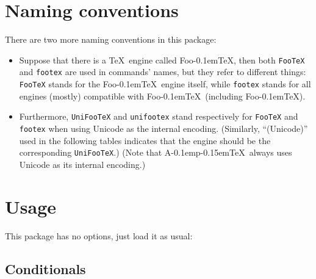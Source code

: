 \documentclass[a4paper]{article}
\newcommand\pTeX{p\kern-0.15em\TeX}
\newcommand\ApTeX{A\kern-0.1em\pTeX}
\newcommand\FooTeX{Foo\kern-0.1em\TeX}
\newcommand\UNI{(Unicode)}
\begin{document}
\section{Naming conventions}

There are two more naming conventions in this package:
\begin{itemize}
\item Suppose that there is a \TeX\ engine called \FooTeX, then both
  \verb|FooTeX| and \verb|footex| are used in commands' names, but they refer to
  different things: \verb|FooTeX| stands for the \FooTeX\ engine itself, while
  \verb|footex| stands for all engines (mostly) compatible with \FooTeX\
  (including \FooTeX).
\item Furthermore, \verb|UniFooTeX| and \verb|unifootex| stand respectively for
  \verb|FooTeX| and \verb|footex| when using Unicode as the internal encoding.
  (Similarly, ``\UNI'' used in the following tables indicates that the engine
  should be the corresponding \verb|UniFooTeX|.) (Note that \ApTeX\ always uses
  Unicode as its internal encoding.)
\end{itemize}

\section{Usage}

This package has no options, just load it as usual:
\begin{itemize}
\item \LaTeX: \verb|\usepackage{ifxptex}|
\item Plain \TeX: \verb|
\end{itemize}

\subsection{Conditionals}
\end{document}
